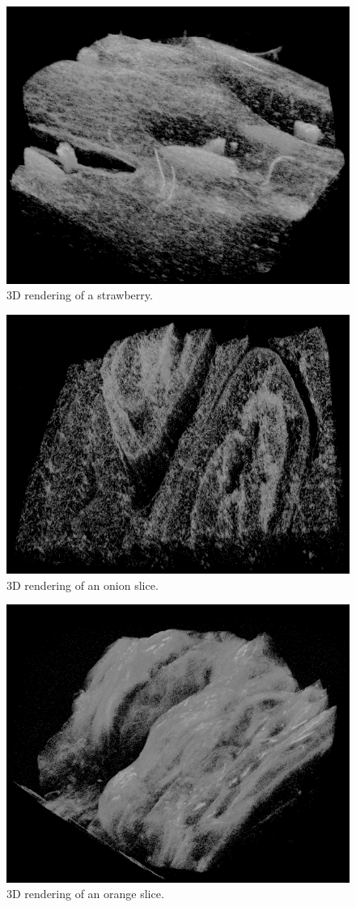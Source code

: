 	\begin{figure}[hbt]
		\centering
		\includegraphics[width=0.8\linewidth]{gfx/3d/strawberry}
		\caption[]{3D rendering of a strawberry.}\label{fig:strawberry-3d}
	\end{figure}

	\begin{figure}[hbt]
		\centering
		\includegraphics[width=0.8\linewidth]{gfx/3d/onion}
		\caption[]{3D rendering of an onion slice.}\label{fig:onion-3d}
	\end{figure}

	\begin{figure}[hbt]
		\centering
		\includegraphics[width=0.8\linewidth]{gfx/3d/orange}
		\caption[]{3D rendering of an orange slice.}\label{fig:orange-3d}
	\end{figure}

